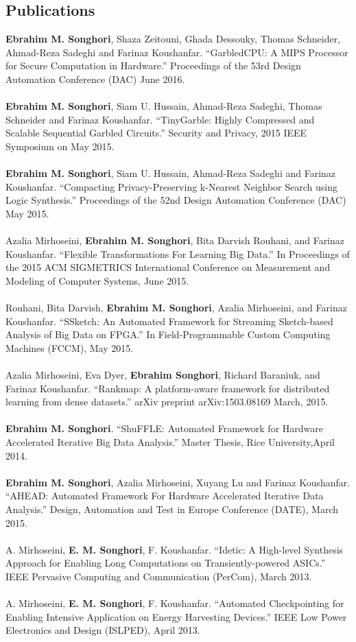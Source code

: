 \documentclass[overlapped]{res}
\begin{document}
\begin{resume}
\section{Publications}
{\bf Ebrahim M. Songhori}, Shaza Zeitouni, Ghada Dessouky, Thomas Schneider, Ahmad-Reza Sadeghi and Farinaz Koushanfar. ``GarbledCPU: A MIPS Processor for Secure Computation in Hardware.'' Proceedings of the 53rd Design Automation Conference (DAC) June 2016.\\\\
{\bf Ebrahim M. Songhori}, Siam U. Hussain, Ahmad-Reza Sadeghi, Thomas Schneider and Farinaz Koushanfar. ``TinyGarble: Highly Compressed and Scalable Sequential Garbled Circuits.'' Security and Privacy, 2015 IEEE Symposium on May 2015.\\\\
{\bf Ebrahim M. Songhori}, Siam U. Hussain, Ahmad-Reza Sadeghi and Farinaz Koushanfar. ``Compacting Privacy-Preserving k-Nearest Neighbor Search using Logic Synthesis.'' Proceedings of the 52nd Design Automation Conference (DAC) May 2015.\\\\
Azalia Mirhoseini, {\bf Ebrahim M. Songhori}, Bita Darvish Rouhani, and Farinaz Koushanfar. ``Flexible Transformations For Learning Big Data.'' In Proceedings of the 2015 ACM SIGMETRICS International Conference on Measurement and Modeling of Computer Systems, June 2015.\\\\
Rouhani, Bita Darvish, {\bf Ebrahim M. Songhori}, Azalia Mirhoseini, and Farinaz Koushanfar. ``SSketch: An Automated Framework for Streaming Sketch-based Analysis of Big Data on FPGA.'' In Field-Programmable Custom Computing Machines (FCCM), May 2015.\\\\
Azalia Mirhoseini, Eva Dyer, {\bf Ebrahim Songhori}, Richard Baraniuk, and Farinaz Koushanfar. ``Rankmap: A platform-aware framework for distributed learning from dense datasets.'' arXiv preprint arXiv:1503.08169 March, 2015.\\\\
{\bf Ebrahim M. Songhori}. ``ShuFFLE: Automated Framework for Hardware Accelerated Iterative Big Data Analysis.'' Master Thesis, Rice University,April 2014.\\\\
{\bf Ebrahim M. Songhori}, Azalia Mirhoseini, Xuyang Lu and Farinaz Koushanfar. ``AHEAD: Automated Framework For Hardware Accelerated Iterative Data Analysis.'' Design, Automation and Test in Europe Conference (DATE), March 2015.\\\\
A. Mirhoseini, {\bf E. M. Songhori}, F. Koushanfar. ``Idetic: A High-level Synthesis Approach for Enabling Long Computations on Transiently-powered ASICs.'' IEEE Pervasive Computing and Communication (PerCom), March 2013.\\\\
A. Mirhoseini, {\bf E. M. Songhori}, F. Koushanfar. ``Automated Checkpointing for Enabling Intensive Application on Energy Harvesting Devices.'' IEEE Low Power Electronics and Design (ISLPED), April 2013.
\end{resume}
\end{document}
